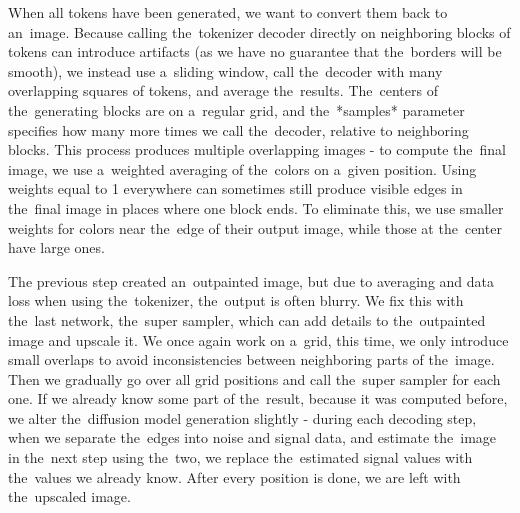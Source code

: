 When all tokens have been generated, we want to convert them back to an~image. Because calling the~tokenizer decoder directly on neighboring blocks of tokens can introduce artifacts (as we have no guarantee that the~borders will be smooth), we instead use a~sliding window, call the~decoder with many overlapping squares of tokens, and average the~results. The~centers of the~generating blocks are on a~regular grid, and the~*samples* parameter specifies how many more times we call the~decoder, relative to neighboring blocks. This process produces multiple overlapping images - to compute the~final image, we use a~weighted averaging of the~colors on a~given position. Using weights equal to 1 everywhere can sometimes still produce visible edges in the~final image in places where one block ends. To eliminate this, we use smaller weights for colors near the~edge of their output image, while those at the~center have large ones.

The previous step created an~outpainted image, but due to averaging and data loss when using the~tokenizer, the~output is often blurry. We fix this with the~last network, the~super sampler, which can add details to the~outpainted image and upscale it. We once again work on a~grid, this time, we only introduce small overlaps to avoid inconsistencies between neighboring parts of the~image. Then we gradually go over all grid positions and call the~super sampler for each one. If we already know some part of the~result, because it was computed before, we alter the~diffusion model generation slightly - during each decoding step, when we separate the~edges into noise and signal data, and estimate the~image in the~next step using the~two, we replace the~estimated signal values with the~values we already know. After every position is done, we are left with the~upscaled image.
